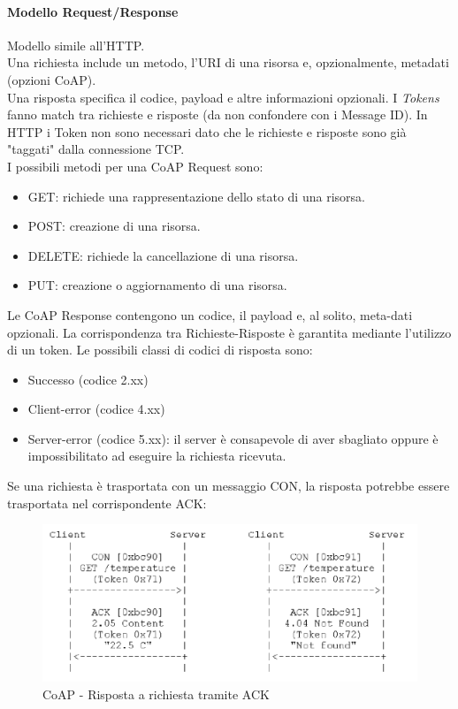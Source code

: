 \documentclass{article}
\begin{document}
\paragraph{Modello Request/Response} Modello simile all'HTTP. \\ Una richiesta include un metodo, l'URI di una risorsa e, opzionalmente, metadati (opzioni CoAP). \\ Una risposta specifica il codice, payload e altre informazioni opzionali. I \textit{Tokens} fanno match tra richieste e risposte (da non confondere con i Message ID). In HTTP i Token non sono necessari dato che le richieste e risposte sono già "taggati" dalla connessione TCP. \\ I possibili metodi per una CoAP Request sono:
\begin{itemize}
    \item GET: richiede una rappresentazione dello stato di una risorsa.
    \item POST: creazione di una risorsa.
    \item DELETE: richiede la cancellazione di una risorsa.
    \item PUT: creazione o aggiornamento di una risorsa.
\end{itemize}
Le CoAP Response contengono un codice, il payload e, al solito, meta-dati opzionali. La corrispondenza tra Richieste-Risposte è garantita mediante l'utilizzo di un token. Le possibili classi di codici di risposta sono:
\begin{itemize}
    \item Successo (codice 2.xx)
    \item Client-error (codice 4.xx)
    \item Server-error (codice 5.xx): il server è consapevole di aver sbagliato oppure è impossibilitato ad eseguire la richiesta ricevuta.
\end{itemize}
Se una richiesta è trasportata con un messaggio CON, la risposta potrebbe essere trasportata nel corrispondente ACK:
\begin{figure}[H]
\centering
\includegraphics[scale=0.6]{figures/coap risposta ack.png}
\caption{CoAP - Risposta a richiesta tramite ACK}
\end{figure}
\end{document}

